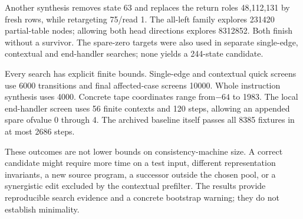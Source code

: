 Another synthesis removes state 63 and replaces the return roles 48,112,131
by fresh rows, while retargeting 75/read 1. The all-left family explores 231420
partial-table nodes; allowing both head directions explores 8312852. Both
finish without a survivor. The spare-zero targets were also used in separate
single-edge, contextual and end-handler searches; none yields a 244-state
candidate.

Every search has explicit finite bounds. Single-edge and contextual quick
screens use 6000 transitions and final affected-case screens 10000. Whole
instruction synthesis uses 4000. Concrete tape coordinates range from$-64$
to 1983. The local end-handler screen uses 56 finite contexts and 120 steps,
allowing an appended spare ofvalue 0 through 4. The archived baseline itself
passes all 8385 fixtures in at most 2686 steps.

These outcomes are not lower bounds on consistency-machine size. A correct
candidate might require more time on a test input, different representation
invariants, a new source program, a successor outside the chosen pool, or a
synergistic edit excluded by the contextual prefilter. The results provide
reproducible search evidence and a concrete bootstrap warning; they do not
establish minimality.
